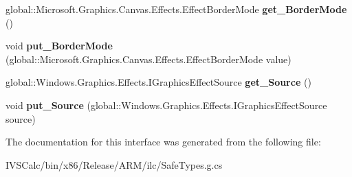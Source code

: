 \begin{DoxyCompactItemize}
global\+::\+Microsoft.\+Graphics.\+Canvas.\+Effects.\+Effect\+Border\+Mode {\bfseries get\+\_\+\+Border\+Mode} ()
\item 
\mbox{\label{interface_microsoft_1_1_graphics_1_1_canvas_1_1_effects_1_1_i_crop_effect_ae88c621641cd9be11414409037414d5e}} 
void {\bfseries put\+\_\+\+Border\+Mode} (global\+::\+Microsoft.\+Graphics.\+Canvas.\+Effects.\+Effect\+Border\+Mode value)
\item 
\mbox{\label{interface_microsoft_1_1_graphics_1_1_canvas_1_1_effects_1_1_i_crop_effect_ae17d9daa0439d30e16235dde28fde47d}} 
global\+::\+Windows.\+Graphics.\+Effects.\+I\+Graphics\+Effect\+Source {\bfseries get\+\_\+\+Source} ()
\item 
\mbox{\label{interface_microsoft_1_1_graphics_1_1_canvas_1_1_effects_1_1_i_crop_effect_aad283c62ebd28ad1ba136787595806fa}} 
void {\bfseries put\+\_\+\+Source} (global\+::\+Windows.\+Graphics.\+Effects.\+I\+Graphics\+Effect\+Source source)
\end{DoxyCompactItemize}


The documentation for this interface was generated from the following file\+:\begin{DoxyCompactItemize}
\item 
I\+V\+S\+Calc/bin/x86/\+Release/\+A\+R\+M/ilc/Safe\+Types.\+g.\+cs\end{DoxyCompactItemize}
